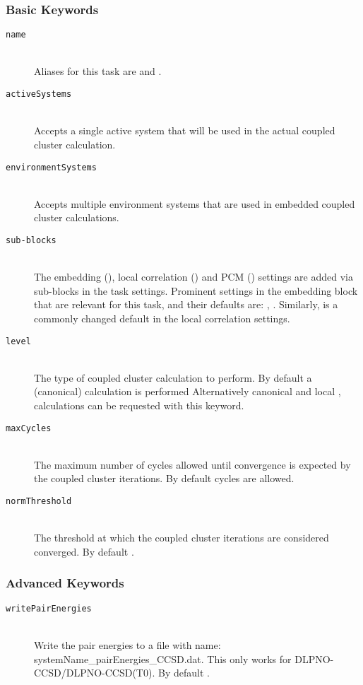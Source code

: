 \subsubsection{Basic Keywords}
\begin{description}
 \item [\texttt{name}]\hfill \\
   Aliases for this task are  and .
 \item [\texttt{activeSystems}]\hfill \\
   Accepts a single active system that will be used in the actual coupled cluster calculation.
 \item [\texttt{environmentSystems}]\hfill \\
   Accepts multiple environment systems that are used in embedded coupled cluster calculations.
 \item [\texttt{sub-blocks}]\hfill \\
   The embedding (), local correlation () and PCM () settings are added via sub-blocks in the task settings.
   Prominent settings in the embedding block that are relevant for this task, and their defaults are:
   , .
   Similarly,  is a commonly changed default in the local correlation settings.
 \item [\texttt{level}]\hfill \\
   The type of coupled cluster calculation to perform. By default a (canonical)  calculation is performed
   Alternatively canonical  and local ,  calculations can be
   requested with this keyword.
 \item [\texttt{maxCycles}]\hfill \\
   The maximum number of cycles allowed until convergence is expected by the coupled cluster iterations.
   By default  cycles are allowed.
 \item [\texttt{normThreshold}]\hfill \\
   The threshold at which the coupled cluster iterations are considered converged. By default .
\end{description}
\subsubsection{Advanced Keywords}
\begin{description}
  \item [\texttt{writePairEnergies}]\hfill \\
  Write the pair energies to a file with name: systemName\_pairEnergies\_CCSD.dat. This only works for
  DLPNO-CCSD/DLPNO-CCSD(T0). By default .
\end{description}
